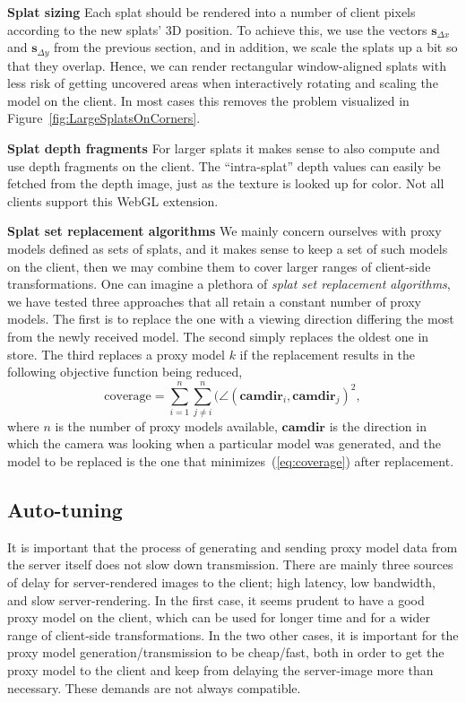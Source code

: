 \documentclass[10pt,conference,compsocconf]{IEEEtran}
\newcommand{\sv}{\mathbf{s}}
\begin{document}
\textbf{Splat sizing} 
Each splat should be rendered into a number of client pixels according to the
new splats' 3D position. To achieve this, we use the vectors $\sv_{\Delta x}$
and $\sv_{\Delta y}$ from the previous section, and in addition, we scale the
splats up a bit so that they overlap. Hence, we can render rectangular
window-aligned splats with less risk of getting uncovered areas when
interactively rotating and scaling the model on the client. In most cases this
removes the problem visualized in Figure~\ref{fig:LargeSplatsOnCorners}.

\textbf{Splat depth fragments}
For larger splats it makes sense to also compute and use depth fragments on the
client. The ``intra-splat'' depth values can easily be fetched from the depth
image, just as the texture is looked up for color. Not all clients support this
WebGL extension.

\textbf{Splat set replacement algorithms}
We mainly concern ourselves with proxy models defined as sets of splats, and it
makes sense to keep a set of such models on the client, then we may combine them
to cover larger ranges of client-side transformations. One can imagine a plethora of
{\em splat set replacement algorithms}, we have tested three approaches that all
retain a constant number of proxy models. The first is to replace the
one with a viewing direction differing the most from the newly received
model. The second simply replaces the oldest one in store. The third replaces a
proxy model $k$ if the replacement results in the following objective function
being reduced,
\begin{equation}
  \text{coverage} =
  \sum_{i=1}^n
    \sum_{j\neq i}^n 
      ( \angle(\textbf{camdir}_i, \textbf{camdir}_j )^2,
  \label{eq:coverage}
\end{equation}
where $n$ is the number of proxy models available, $\textbf{camdir}$ is the
direction in which the camera was looking when a particular model was generated,
and the model to be replaced is the one that minimizes~(\ref{eq:coverage}) after
replacement.


\subsection{Auto-tuning}
\label{sec:autoTuning}

It is important that the process of generating and sending proxy model data from
the server itself does not slow down transmission.  There are mainly three
sources of delay for server-rendered images to the client; high latency, low
bandwidth, and slow server-rendering.  In the first case, it seems prudent to
have a good proxy model on the client, which can be used for longer time and for
a wider range of client-side transformations.  In the two other cases, it is
important for the proxy model generation/transmission to be cheap/fast, both in order
to get the proxy model to the client and keep from delaying the server-image
more than necessary. These demands are not always compatible.
\end{document}
